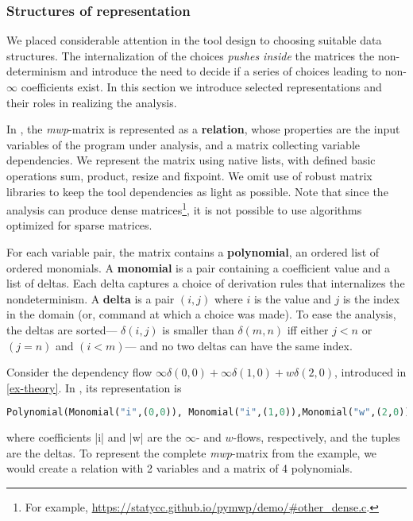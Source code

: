 {{    \subsubsection{Structures of representation}
    \label{subsec:rep}

    We placed considerable attention in the tool design to choosing suitable data structures. 
    The internalization of the choices \emph{pushes inside} the matrices the non-determinism and introduce the need to decide
    if a series of choices leading to non-\(\infty\) coefficients exist.
    In this section we introduce selected representations and their roles in
    realizing the analysis.

    In \pymwp, the \emph{mwp}-matrix is represented as a \textbf{relation}, whose properties are the input variables of
    the program under analysis, and a matrix collecting variable dependencies.
    We represent the matrix using native lists, with defined basic operations \eg sum, product, resize and fixpoint.
    We omit use of robust matrix libraries to keep the tool dependencies as light as possible.
    Note that since the analysis can produce dense matrices\footnote{For example, \url{https://statycc.github.io/pymwp/demo/\#other_dense.c}.}, it is not possible to use
    algorithms optimized for sparse matrices.

    For each variable pair, the matrix contains a \textbf{polynomial}, an ordered list of ordered monomials. A
    \textbf{monomial} is a pair containing a coefficient value and a list of deltas.
    Each delta captures a choice of derivation rules that internalizes the nondeterminism.
    A \textbf{delta} is a pair $(i, j)$ where $i$ is the value and $j$ is the index in the domain (or, command at which a choice was made).
    To ease the analysis,
    the deltas are sorted--- $\delta(i,j)$ is smaller than $\delta(m,n)$ iff either $j<n$ or $(j=n)$ and
    $(i<m)$--- and no two deltas can have the same index.

    \begin{example}
        \label{ex-poly}

        Consider the dependency flow $\infty \delta(0, 0) + \infty \delta(1,0) + w
        \delta(2,0)$, introduced in
        \autoref{ex-theory}.
        In \pymwp, its representation is 

            {\centering
        \begin{lstlisting}[language=Python,basicstyle=\ttfamily\footnotesize,breaklines=true,postbreak=\mbox{\textcolor{red}{$\hookrightarrow$}\space},]
    Polynomial(Monomial("i",(0,0)), Monomial("i",(1,0)),Monomial("w",(2,0)))
        \end{lstlisting}}
        where coefficients \pr|i| and \pr|w| are the $\infty$- and $w$-flows, respectively, and the tuples
        are the deltas.
        To represent the complete \emph{mwp}-matrix from the example, we would create a relation with 2 variables and a matrix of 4 polynomials.


\end{example}}}
